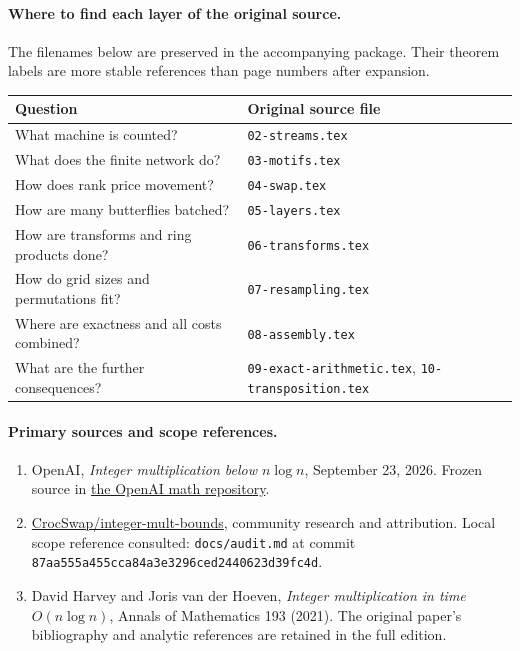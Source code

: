 \paragraph{Where to find each layer of the original source.}
The filenames below are preserved in the accompanying package. Their theorem
labels are more stable references than page numbers after expansion.
\begin{center}\small
\begin{tabular}{@{}ll@{}}\toprule
Question & Original source file \\
\midrule
What machine is counted? & \texttt{02-streams.tex} \\
What does the finite network do? & \texttt{03-motifs.tex} \\
How does rank price movement? & \texttt{04-swap.tex} \\
How are many butterflies batched? & \texttt{05-layers.tex} \\
How are transforms and ring products done? & \texttt{06-transforms.tex} \\
How do grid sizes and permutations fit? & \texttt{07-resampling.tex} \\
Where are exactness and all costs combined? & \texttt{08-assembly.tex} \\
What are the further consequences? & \texttt{09-exact-arithmetic.tex}, \texttt{10-transposition.tex} \\
\bottomrule\end{tabular}\end{center}

\paragraph{Primary sources and scope references.}
\begin{enumerate}
\item OpenAI, \emph{Integer multiplication below $n\log n$}, September 23,
2026. Frozen source in
\href{https://github.com/openai/math/tree/adc7f1241b42e322a6451854ab7e4b4c146bf78a/preprints/Integer-multiplication-below-n-log-n-September-23-2026}{the OpenAI math repository}.
\item \href{https://github.com/CrocSwap/integer-mult-bounds}{CrocSwap/integer-mult-bounds},
community research and attribution. Local scope reference consulted:
\texttt{docs/audit.md} at commit
\texttt{87aa555a455cca84a3e3296ced2440623d39fc4d}.
\item David Harvey and Joris van der Hoeven, \emph{Integer multiplication in
time $O(n\log n)$}, Annals of Mathematics 193 (2021). The original paper's
bibliography and analytic references are retained in the full edition.
\end{enumerate}
